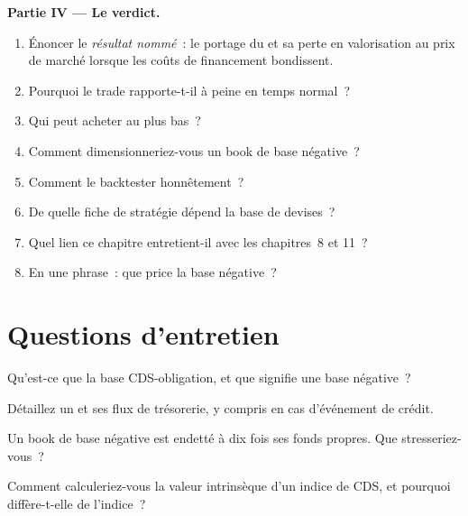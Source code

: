 \begin{problem}
\medskip\noindent\textbf{Partie IV --- Le verdict.}
\begin{enumerate}[resume]
\item Énoncer le \emph{résultat nommé}~: le portage du  et sa perte en valorisation au prix de marché lorsque les coûts de financement bondissent.
\item Pourquoi le trade rapporte-t-il à peine en temps normal~?
\item Qui peut acheter au plus bas~?
\item Comment dimensionneriez-vous un book de base négative~?
\item Comment le backtester honnêtement~?
\item De quelle fiche de stratégie dépend la base de devises~?
\item Quel lien ce chapitre entretient-il avec les chapitres~8 et 11~?
\item En une phrase~: que price la base négative~?
\end{enumerate}
\end{problem}

\section{Questions d'entretien}

\begin{interviewq}\label{iq:s2:credit-relative-value:1}
Qu'est-ce que la base CDS-obligation, et que signifie une base négative~?
\end{interviewq}

\begin{interviewq}\label{iq:s2:credit-relative-value:2}
Détaillez un  et ses flux de trésorerie, y compris en cas d'événement de crédit.
\end{interviewq}

\begin{interviewq}\label{iq:s2:credit-relative-value:3}
Un book de base négative est endetté à dix fois ses fonds propres. Que stresseriez-vous~?
\end{interviewq}

\begin{interviewq}\label{iq:s2:credit-relative-value:4}
Comment calculeriez-vous la valeur intrinsèque d'un indice de CDS, et pourquoi diffère-t-elle de l'indice~?
\end{interviewq}

